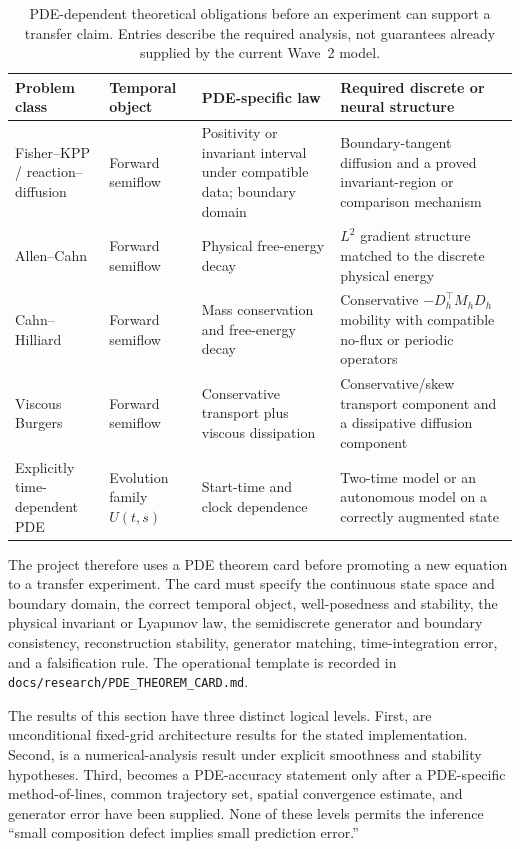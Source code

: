 \begin{table}[htbp]
\centering
\caption{PDE-dependent theoretical obligations before an experiment can support a transfer claim.  Entries describe the required analysis, not guarantees already supplied by the current Wave~2 model.}
\label{tab:pde-theory-obligations}
\small
\begin{tabular}{@{}>{\raggedright\arraybackslash}p{}>{\raggedright\arraybackslash}p{}>{\raggedright\arraybackslash}p{}>{\raggedright\arraybackslash}p{}@{}}
\hline
Problem class & Temporal object & PDE-specific law & Required discrete or neural structure \\
\hline
Fisher--KPP / reaction--diffusion & Forward semiflow & Positivity or invariant interval under compatible data; boundary domain & Boundary-tangent diffusion and a proved invariant-region or comparison mechanism \\
Allen--Cahn & Forward semiflow & Physical free-energy decay & $L^2$ gradient structure matched to the discrete physical energy \\
Cahn--Hilliard & Forward semiflow & Mass conservation and free-energy decay & Conservative $-D_h^\top M_hD_h$ mobility with compatible no-flux or periodic operators \\
Viscous Burgers & Forward semiflow & Conservative transport plus viscous dissipation & Conservative/skew transport component and a dissipative diffusion component \\
Explicitly time-dependent PDE & Evolution family $U(t,s)$ & Start-time and clock dependence & Two-time model or an autonomous model on a correctly augmented state \\
\hline
\end{tabular}
\end{table}

The project therefore uses a PDE theorem card before promoting a new equation to a transfer experiment.  The card must specify the continuous state space and boundary domain, the correct temporal object, well-posedness and stability, the physical invariant or Lyapunov law, the semidiscrete generator and boundary consistency, reconstruction stability, generator matching, time-integration error, and a falsification rule.  The operational template is recorded in \texttt{docs/research/PDE\_THEOREM\_CARD.md}.

\begin{remark}\label{rem:boundary-claim-hierarchy}
The results of this section have three distinct logical levels.  First,  are unconditional fixed-grid architecture results for the stated implementation.  Second,  is a numerical-analysis result under explicit smoothness and stability hypotheses.  Third,  becomes a PDE-accuracy statement only after a PDE-specific method-of-lines, common trajectory set, spatial convergence estimate, and generator error have been supplied.  None of these levels permits the inference ``small composition defect implies small prediction error.''
\end{remark}
